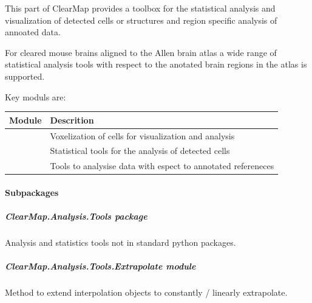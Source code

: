 \documentclass[letterpaper,10pt,english]{sphinxmanual}
\begin{document}
This part of ClearMap provides a toolbox for the statistical analysis and
visualization of detected cells or structures and region specific analysis
of annoated data.

For cleared mouse brains aligned to the Allen brain atlas a wide range of
statistical analysis tools with respect to the anotated brain regions in
the atlas is supported.

Key moduls are:

\begin{tabulary}{\linewidth}{|L|L|}
\hline
\textsf{\relax 
Module
} & \textsf{\relax 
Descrition
}\\
\hline
{\hyperref[api/ClearMap.Analysis:module-ClearMap.Analysis.Voxelization]{\emph{}}}
 & 
Voxelization of cells for visualization and analysis
\\
\hline
{\hyperref[api/ClearMap.Analysis:module-ClearMap.Analysis.Statistics]{\emph{}}}
 & 
Statistical tools for the analysis of detected cells
\\
\hline
{\hyperref[api/ClearMap.Analysis:module-ClearMap.Analysis.Label]{\emph{}}}
 & 
Tools to analysise data with espect to annotated refereneces
\\
\hline\end{tabulary}



\paragraph{Subpackages}
\label{api/ClearMap.Analysis:subpackages}

\subparagraph{ClearMap.Analysis.Tools package}
\label{api/ClearMap.Analysis.Tools:clearmap-analysis-tools-package}\label{api/ClearMap.Analysis.Tools:module-ClearMap.Analysis.Tools}\label{api/ClearMap.Analysis.Tools::doc}
Analysis and statistics tools not in standard python packages.


\subparagraph{ClearMap.Analysis.Tools.Extrapolate module}
\label{api/ClearMap.Analysis.Tools:clearmap-analysis-tools-extrapolate-module}\label{api/ClearMap.Analysis.Tools:module-ClearMap.Analysis.Tools.Extrapolate}
Method to extend interpolation objects to constantly / linearly extrapolate.
\end{document}
